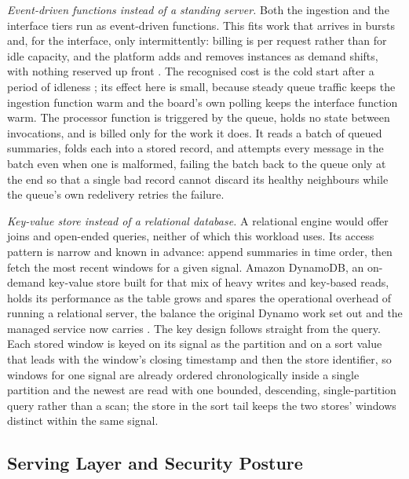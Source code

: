 \documentclass[conference]{IEEEtran}
\begin{document}
\textit{Event-driven functions instead of a standing server.} Both the ingestion and the interface tiers run as event-driven functions. This fits work that arrives in bursts and, for the interface, only intermittently: billing is per request rather than for idle capacity, and the platform adds and removes instances as demand shifts, with nothing reserved up front \cite{armbrust2010}. The recognised cost is the cold start after a period of idleness \cite{wang2018}; its effect here is small, because steady queue traffic keeps the ingestion function warm and the board's own polling keeps the interface function warm. The processor function is triggered by the queue, holds no state between invocations, and is billed only for the work it does. It reads a batch of queued summaries, folds each into a stored record, and attempts every message in the batch even when one is malformed, failing the batch back to the queue only at the end so that a single bad record cannot discard its healthy neighbours while the queue's own redelivery retries the failure.

\textit{Key-value store instead of a relational database.} A relational engine would offer joins and open-ended queries, neither of which this workload uses. Its access pattern is narrow and known in advance: append summaries in time order, then fetch the most recent windows for a given signal. Amazon DynamoDB, an on-demand key-value store built for that mix of heavy writes and key-based reads, holds its performance as the table grows and spares the operational overhead of running a relational server, the balance the original Dynamo work set out and the managed service now carries \cite{decandia2007, elhemali2022}. The key design follows straight from the query. Each stored window is keyed on its signal as the partition and on a sort value that leads with the window's closing timestamp and then the store identifier, so windows for one signal are already ordered chronologically inside a single partition and the newest are read with one bounded, descending, single-partition query rather than a scan; the store in the sort tail keeps the two stores' windows distinct within the same signal.

\subsection{Serving Layer and Security Posture}
\end{document}
